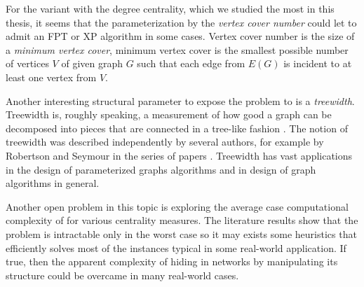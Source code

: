 For the variant with the degree centrality, which we studied the most in this thesis,
it seems that the parameterization by the \emph{vertex cover number} could let \HL to admit an FPT or XP algorithm in some cases.
Vertex cover number is the size of a \emph{minimum vertex cover},
minimum vertex cover is the smallest possible number of vertices $V$ of given graph $G$ such that each edge from $E(G)$ is incident
to at least one vertex from $V$.

Another interesting structural parameter to expose the problem to is a \emph{treewidth}.
Treewidth is, roughly speaking, a measurement of how good a graph can be decomposed into pieces that are connected in a
tree-like fashion \cite[p.~151]{Cygan2015}.
The notion of treewidth was described independently by several authors,
for example by Robertson and Seymour in the series of papers \cite{Robertson1984,Robertson1986.2,Robertson1986.5}. 
Treewidth has vast applications in the design of parameterized graphs algorithms and
in design of graph algorithms in general.

Another open problem in this topic is exploring the average case computational complexity of \HL for various centrality measures.
The literature results show that the problem is intractable only in the worst case so
it may exists some heuristics that efficiently solves most of the instances typical in some real-world application.
If true, then the apparent complexity of hiding in networks by manipulating its structure
could be overcame in many real-world cases. \cite{Dey2019}
